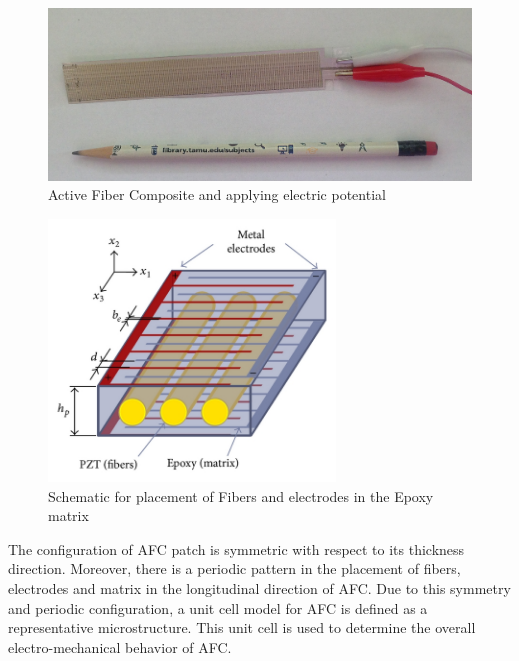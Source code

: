 \begin{figure} 
\centering
\includegraphics[width=6.0in]{./chap_4_structural_analyses/afc_unit_cell/afc_picture_from_lap.png}
\caption{Active Fiber Composite and applying electric potential}
\label{fig:afc_picture_from_lap}
\end{figure}

\begin{figure} 
\centering
\includegraphics[width=3.0in]{./chap_4_structural_analyses/afc_unit_cell/schematic_afc_unit_cell.jpg}
\caption{Schematic for placement of Fibers and electrodes in the Epoxy matrix \cite{jemai2014mathematical}}
\label{fig:schematic_afc_unit_cell}
\end{figure}

The configuration of AFC patch is symmetric with respect to its thickness direction.
Moreover, there is a periodic pattern in the placement of fibers, electrodes and matrix in the longitudinal direction of AFC.
Due to this symmetry and periodic configuration, a unit cell model for AFC is defined as a representative microstructure.
This unit cell is used to determine the overall electro-mechanical behavior of AFC.  
 
